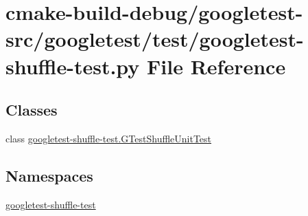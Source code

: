 \hypertarget{googletest-shuffle-test_8py}{}\section{cmake-\/build-\/debug/googletest-\/src/googletest/test/googletest-\/shuffle-\/test.py File Reference}
\label{googletest-shuffle-test_8py}
\subsection*{Classes}
\begin{DoxyCompactItemize}
\item 
class \mbox{\hyperlink{classgoogletest-shuffle-test_1_1GTestShuffleUnitTest}{googletest-\/shuffle-\/test.\+G\+Test\+Shuffle\+Unit\+Test}}
\end{DoxyCompactItemize}
\subsection*{Namespaces}
\begin{DoxyCompactItemize}
\item 
 \mbox{\hyperlink{namespacegoogletest-shuffle-test}{googletest-\/shuffle-\/test}}
\end{DoxyCompactItemize}
